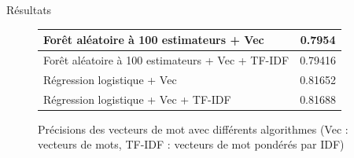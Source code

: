 \documentclass{beamer}
\begin{document}
\begin{frame}{Résultats}
\begin{figure}
\begin{center}
\begin{tabular}{|l|c|}
	\hline
	Forêt aléatoire à 100 estimateurs + Vec & 0.7954 \\
	\hline
	Forêt aléatoire à 100 estimateurs + Vec + TF-IDF & 0.79416 \\
	\hline
	Régression logistique + Vec & 0.81652 \\
	\hline
	Régression logistique + Vec + TF-IDF & 0.81688 \\
	\hline
\end{tabular}
\caption{Précisions des vecteurs de mot avec différents algorithmes (Vec : vecteurs de mots, TF-IDF : vecteurs de mot pondérés par IDF)}
\end{center}
\end{figure}
\end{frame}
\end{document}
